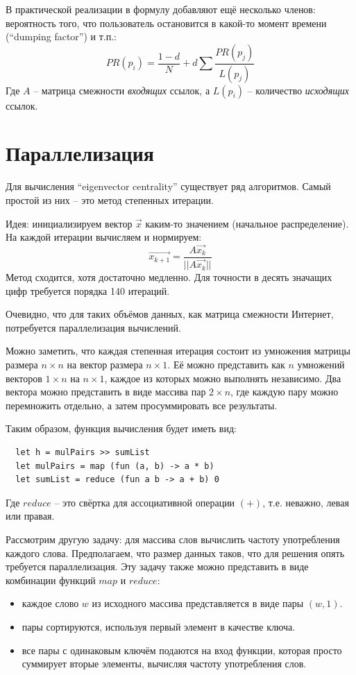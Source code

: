 \documentclass[a4paper,11pt]{article}
\begin{document}
В практической реализации в формулу добавляют ещё несколько членов:
вероятность того, что пользователь остановится в какой-то момент времени
(``dumping factor'') и т.п.:
\begin{equation*}
  PR(p_i) = \frac{1-d}{N} + d \sum \frac{PR(p_j)}{L(p_j)}
\end{equation*}
Где $A$ -- матрица смежности \emph{входящих} ссылок, а $L(p_i)$ -- 
количество \emph{исходящих} ссылок.

\section{Параллелизация}
Для вычисления ``eigenvector centrality'' существует ряд алгоритмов. Самый
простой из них -- это метод степенных итерации.

Идея: инициализируем вектор $\vec{x}$ каким-то значением (начальное 
распределение). На каждой итерации вычисляем и нормируем:
\begin{equation*}
  \vec{x_{k+1}} = \frac{A \vec{x_k}}{||A \vec{x_k}||}
\end{equation*}
Метод сходится, хотя достаточно медленно. Для точности в десять значащих
цифр требуется порядка 140 итераций.

Очевидно, что для таких объёмов данных, как матрица смежности Интернет,
потребуется параллелизация вычислений.

Можно заметить, что каждая степенная итерация состоит из умножения матрицы
размера $n \times n$ на вектор размера $n \times 1$. Её можно представить
как $n$ умножений векторов $1 \times n$ на $n \times 1$, каждое из которых
можно выполнять независимо. Два вектора можно представить в виде массива
пар $2 \times n$, где каждую пару можно перемножить отдельно, а затем
просуммировать все результаты.

Таким образом, функция вычисления будет иметь вид:
\begin{lstlisting}
  let h = mulPairs >> sumList
  let mulPairs = map (fun (a, b) -> a * b)
  let sumList = reduce (fun a b -> a + b) 0
\end{lstlisting}
Где $reduce$ -- это свёртка для ассоциативной операции $(+)$, т.е. неважно,
левая или правая.

Рассмотрим другую задачу: для массива слов вычислить частоту употребления
каждого слова. Предполагаем, что размер данных таков, что для решения опять
требуется параллелизация. Эту задачу также можно представить в виде комбинации
функций $map$ и $reduce$:
\begin{itemize}
\item каждое слово $w$ из исходного массива представляется в виде пары $(w, 1)$.
\item пары сортируются, используя первый элемент в качестве ключа.
\item все пары с одинаковым ключём подаются на вход функции, которая просто
  суммирует вторые элементы, вычисляя частоту употребления слов.
\end{itemize}
\end{document}
